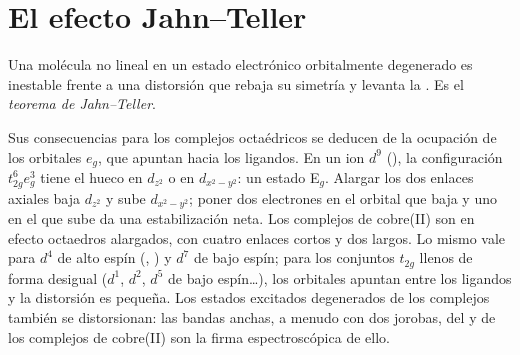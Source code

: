 \section{El efecto Jahn--Teller}

\begin{theorem}\label{thm:b3:complex-spectra-magnetism:jahn-teller}
Una molécula no lineal en un estado electrónico orbitalmente degenerado es inestable
frente a una distorsión que rebaja su simetría y levanta la
. Es el \emph{teorema de Jahn--Teller}.
\end{theorem}

\admitted

Sus consecuencias para los complejos octaédricos se deducen de la ocupación de los
orbitales $e_g$, que apuntan hacia los ligandos. En un ion $d^9$ (), la configuración
$t_{2g}^6e_g^3$ tiene el hueco en $d_{z^2}$ o en $d_{x^2-y^2}$: un estado E$_g$. Alargar los dos enlaces
axiales baja $d_{z^2}$ y sube $d_{x^2-y^2}$; poner dos electrones en el orbital que baja
y uno en el que sube da una estabilización neta. Los complejos de cobre(II) son
en efecto octaedros alargados, con cuatro enlaces cortos y dos largos. Lo mismo vale
para $d^4$ de alto espín (, ) y $d^7$ de bajo espín; para los conjuntos $t_{2g}$ llenos de forma desigual
($d^1$, $d^2$, $d^5$ de bajo espín\dots), los orbitales apuntan entre los ligandos y la
distorsión es pequeña. Los estados excitados degenerados de los complejos también se distorsionan: las
bandas anchas, a menudo con dos jorobas, del  y de los complejos de cobre(II) son
la firma espectroscópica de ello.

